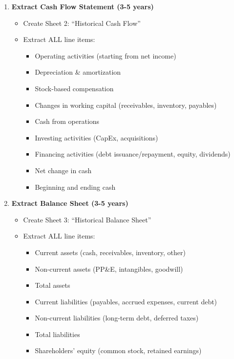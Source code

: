\documentclass[11pt]{article}
\begin{document}
\begin{enumerate}[leftmargin=*,itemsep=2pt,topsep=2pt]
\begin{itemize}[leftmargin=*,itemsep=2pt,topsep=2pt]
\begin{itemize}[leftmargin=*,itemsep=2pt,topsep=2pt]
\item {} Shares outstanding (basic and diluted)
\end{itemize}
\end{itemize}
\item {} \textbf{Extract Cash Flow Statement (3-5 years)}
\begin{itemize}[leftmargin=*,itemsep=2pt,topsep=2pt]
\item {} Create Sheet 2: ``Historical Cash Flow''
\item {} Extract ALL line items:
\begin{itemize}[leftmargin=*,itemsep=2pt,topsep=2pt]
\item {} Operating activities (starting from net income)
\item {} Depreciation \& amortization
\item {} Stock-based compensation
\item {} Changes in working capital (receivables, inventory, payables)
\item {} Cash from operations
\item {} Investing activities (CapEx, acquisitions)
\item {} Financing activities (debt issuance/repayment, equity, dividends)
\item {} Net change in cash
\item {} Beginning and ending cash
\end{itemize}
\end{itemize}
\item {} \textbf{Extract Balance Sheet (3-5 years)}
\begin{itemize}[leftmargin=*,itemsep=2pt,topsep=2pt]
\item {} Create Sheet 3: ``Historical Balance Sheet''
\item {} Extract ALL line items:
\begin{itemize}[leftmargin=*,itemsep=2pt,topsep=2pt]
\item {} Current assets (cash, receivables, inventory, other)
\item {} Non-current assets (PP\&E, intangibles, goodwill)
\item {} Total assets
\item {} Current liabilities (payables, accrued expenses, current debt)
\item {} Non-current liabilities (long-term debt, deferred taxes)
\item {} Total liabilities
\item {} Shareholders' equity (common stock, retained earnings)

\end{itemize}
\end{itemize}
\end{enumerate}
\end{document}
